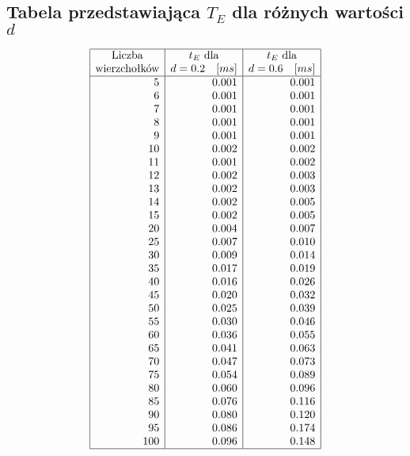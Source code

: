 \documentclass[polish,polish,a4paper]{article}
\begin{document}
\begin{spacing}{1.25}
\begin{spacing}{1.3}
{		\subsection*{Tabela przedstawiająca $T_{E}$ dla różnych wartości $d$ }
	}
	\begin{equation*}
	\begin{array}{|r|r|r|}
	\hline
	\multicolumn{1}{|c|}{$Liczba$}&
	\multicolumn{1}{c|}{t_{E} $ dla$}&
	\multicolumn{1}{c|}{t_{E} $ dla$}\\
	\multicolumn{1}{|c|}{$wierzchołków$}&
	\multicolumn{1}{c|}{d = 0.2 \quad [ms]}&
	\multicolumn{1}{c|}{d= 0.6\quad [ms]}\\
	\hline
5&0.001&0.001\\
6&0.001&0.001\\
7&0.001&0.001\\
8&0.001&0.001\\
9&0.001&0.001\\
10&0.002&0.002\\
11&0.001&0.002\\
12&0.002&0.003\\
13&0.002&0.003\\
14&0.002&0.005\\
15&0.002&0.005\\
20&0.004&0.007\\
25&0.007&0.010\\
30&0.009&0.014\\
35&0.017&0.019\\
40&0.016&0.026\\
45&0.020&0.032\\
50&0.025&0.039\\
55&0.030&0.046\\
60&0.036&0.055\\
65&0.041&0.063\\
70&0.047&0.073\\
75&0.054&0.089\\
80&0.060&0.096\\
85&0.076&0.116\\
90&0.080&0.120\\
95&0.086&0.174\\
100&0.096&0.148\\\hline
	\end{array}
	\end{equation*}
\end{spacing}


\begin{figure}[H]
		\centering

\end{figure}
\end{spacing}
\end{document}
